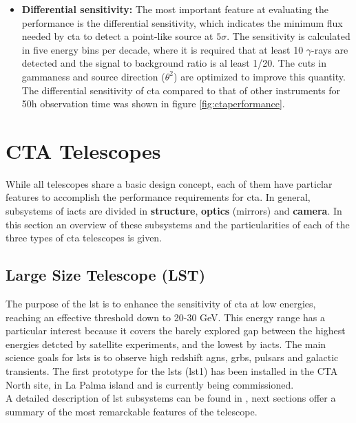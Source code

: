 \documentclass[main.tex]{subfiles}
\begin{document}
\begin{itemize}
\item \textbf{Differential sensitivity:} The most important feature at evaluating the performance is the differential sensitivity, which indicates the minimum flux needed by \gls{cta} to detect a point-like source at $5\sigma$. The sensitivity is calculated in five energy bins per decade, where it is required that at least 10 $\gamma$-rays are detected and the signal to background ratio is al least 1/20. The cuts in gammaness and source direction ($\theta^2$) are optimized to improve this quantity. The differential sensitivity of \gls{cta} compared to that of other instruments for 50h observation time was shown in figure \ref{fig:ctaperformance}.\\
  
\end{itemize}

\section{CTA Telescopes} \label{sec:ctatelescopes}

While all telescopes share a basic design concept, each of them have particlar features to accomplish the performance requirements for \gls{cta}. In general, subsystems of \glspl{iact} are divided in \textbf{structure}, \textbf{optics} (mirrors) and \textbf{camera}. 
In this section an overview of these subsystems and the particularities of each of the three types of \gls{cta} telescopes is given. 

\subsection{Large Size Telescope (LST)}

The purpose of the \gls{lst} is to enhance the sensitivity of \gls{cta} at low energies, reaching an effective threshold down to 20-30 GeV. This energy range has a particular interest because it covers the barely explored gap between the highest energies detcted by satellite experiments, and the lowest by \glspl{iact}. The main science goals for \glspl{lst} is to observe high redshift \glspl{agn}, \glspl{grb}, pulsars and galactic transients. The first prototype for the \glspl{lst} (\gls{lst}1) has been installed in the CTA North site, in La Palma island and is currently being commissioned.\\
A detailed description of \gls{lst} subsystems can be found in \cite{2013LST}, next sections offer a summary of the most remarckable features of the telescope.\\
\end{document}
